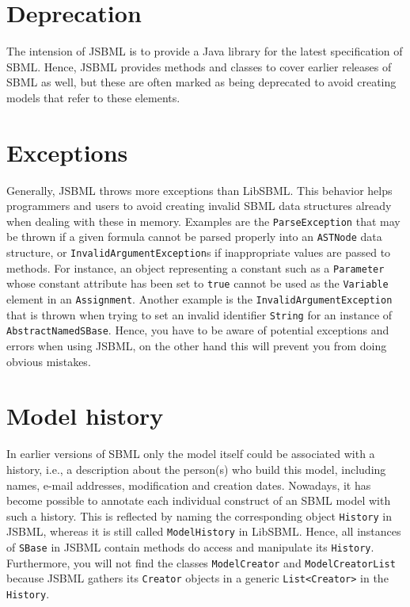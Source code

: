 \documentclass[
  BCOR12mm,
  letterpaper,
  11pt,
  headsepline,
  pointlessnumbers,
  tablecaptionabove,
  headinclude,
  appendixprefix,
  idxtotoc,
  bibtotoc,
  twoside,
  titlepage
]{scrartcl}
\begin{document}
\section{Deprecation}

The intension of JSBML is to provide a Java library for the latest 
specification of SBML. Hence, JSBML provides methods and classes to
cover earlier releases of SBML as well, but these are often marked
as being deprecated to avoid creating models that refer to these 
elements.

\section{Exceptions}

Generally, JSBML throws more exceptions than LibSBML. This behavior helps
programmers and users to avoid creating invalid SBML data structures already
when dealing with these in memory. Examples are the \verb!ParseException! that
may be thrown if a given formula cannot be parsed properly into an
\verb!ASTNode! data structure, or \verb!InvalidArgumentException!s if
inappropriate values are passed to methods. For instance, an object representing
a constant such as a \verb!Parameter! whose constant attribute has been set to
\verb!true! cannot be used as the \verb!Variable! element in an
\verb!Assignment!. Another example is the \verb!InvalidArgumentException! that
is thrown when trying to set an invalid identifier \verb!String! for an instance
of \verb!AbstractNamedSBase!. Hence, you have to be aware of potential
exceptions and errors when using JSBML, on the other hand this will 
prevent you from doing obvious mistakes.


\section{Model history}

In earlier versions of SBML only the model itself could be associated with a
history, i.e., a description about the person(s) who build this model, including
names, e-mail addresses, modification and creation dates. Nowadays, it has
become possible to annotate each individual construct of an SBML model with such
a history. This is reflected by naming the corresponding object \verb!History!
in JSBML, whereas it is still called \verb!ModelHistory! in LibSBML. Hence, all
instances of \verb!SBase! in JSBML contain methods do access and manipulate its
\verb!History!. Furthermore, you will not find the classes \verb!ModelCreator!
and \verb!ModelCreatorList! because JSBML gathers its \verb!Creator! objects
in a generic \verb!List<Creator>! in the \verb!History!.
 
\end{document}

